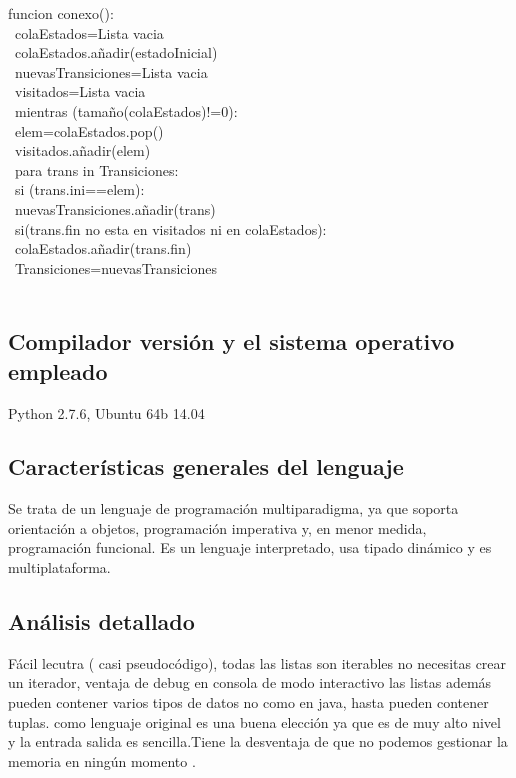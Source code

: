 \documentclass[]{scrartcl}
\begin{document}
funcion conexo():\\ \
\indent    colaEstados=Lista vacia\\ \
\indent    colaEstados.añadir(estadoInicial)\\ \
\indent    nuevasTransiciones=Lista vacia\\ \
\indent    visitados=Lista vacia\\ \
\indent    mientras (tamaño(colaEstados)!=0):\\ \
\indent\indent      elem=colaEstados.pop()\\ \
\indent\indent      visitados.añadir(elem)\\ \
\indent\indent      para trans in Transiciones:\\ \
\indent\indent\indent        si (trans.ini==elem):\\ \
\indent\indent\indent\indent          nuevasTransiciones.añadir(trans)\\ \
\indent\indent\indent          si(trans.fin no esta en  visitados ni en colaEstados):\\ \
 \indent\indent\indent\indent           colaEstados.añadir(trans.fin)\\ \
 \indent   Transiciones=nuevasTransiciones\\ \
 \subsection{Compilador versi\'on y el sistema operativo empleado}
 Python 2.7.6, Ubuntu 64b 14.04
  \subsection{Caracter\'isticas generales del lenguaje}
  Se trata de un lenguaje de programaci\'on multiparadigma, ya que soporta orientaci\'on a objetos, programaci\'on imperativa y, en menor medida, programaci\'on funcional. Es un lenguaje interpretado, usa tipado din\'amico y es multiplataforma.
  \subsection{An\'alisis detallado}
  F\'acil lecutra ( casi pseudoc\'odigo), todas las listas son iterables no necesitas crear un iterador, ventaja de debug en consola de modo interactivo
  las listas adem\'as pueden contener varios tipos de datos no como en java, hasta pueden contener tuplas. como lenguaje original es una buena elecci\'on ya
   que es de muy alto nivel y la entrada salida es sencilla.Tiene la desventaja de que no podemos gestionar la memoria en ning\'un momento .
  
\end{document}
